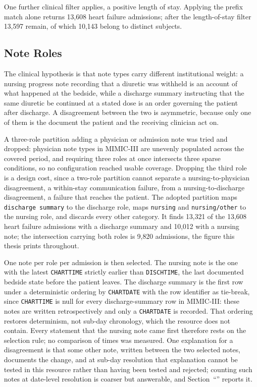 One further clinical filter applies, a positive length of stay. Applying the prefix match alone
returns 13,608 heart failure admissions; after the length-of-stay filter 13,597 remain, of which
10,143 belong to distinct subjects.

\subsection{Note Roles}

The clinical hypothesis is that note types carry different institutional weight: a nursing
progress note recording that a diuretic was withheld is an account of what happened at the
bedside, while a discharge summary instructing that the same diuretic be continued at a
stated dose is an order governing the patient after discharge. A disagreement between the
two is asymmetric, because only one of them is the document the patient and the receiving
clinician act on.

A three-role partition adding a physician or admission note was tried and dropped: physician note
types in MIMIC-III are unevenly populated across the covered period, and requiring three roles at
once intersects three sparse conditions, so no configuration reached usable coverage. Dropping the
third role is a design cost, since a two-role partition cannot separate a nursing-to-physician
disagreement, a within-stay communication failure, from a nursing-to-discharge disagreement, a
failure that reaches the patient. The adopted partition maps \texttt{discharge summary} to the
discharge role, maps \texttt{nursing} and \texttt{nursing/other} to the nursing role, and discards
every other category. It finds 13,321 of the 13,608 heart failure admissions with a discharge
summary and 10,012 with a nursing note; the intersection carrying both roles is 9,820 admissions, the
figure this thesis prints throughout.

One note per role per admission is then selected. The nursing note is the one with the latest
\texttt{CHARTTIME} strictly earlier than \texttt{DISCHTIME}, the last documented bedside state
before the patient leaves. The discharge summary is the first row under a deterministic ordering by
\texttt{CHARTDATE} with the row identifier as tie-break, since \texttt{CHARTTIME} is null for every
discharge-summary row in MIMIC-III: these notes are written retrospectively and only a
\texttt{CHARTDATE} is recorded. That ordering restores determinism, not sub-day chronology, which
the resource does not contain. Every statement that the nursing note came first therefore rests on
the selection rule; no comparison of times was measured. One explanation for a disagreement
is that some other note, written between the two selected notes, documents the change, and
at sub-day resolution that explanation cannot be tested in this resource rather than having
been tested and rejected; counting such notes at date-level resolution is coarser but
answerable, and Section~``'' reports it.


